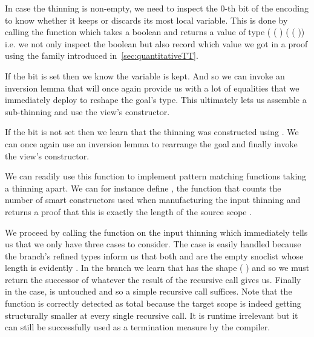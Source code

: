 
In case the thinning is non-empty, we need to inspect the 0-th bit of the encoding
to know whether it keeps or discards its most local variable.
%
This is done by calling the  function which takes a boolean
 and returns a value of type
{( ( ) ( ( ))}
i.e. we not only inspect the boolean but also record which value we got in a proof
using the  family introduced in~\cref{sec:quantitativeTT}.


If the bit is set then we know the variable is kept.
%
And so we can invoke an inversion lemma that will once again provide us with
a lot of equalities that we immediately deploy to reshape the goal's type.
%
This ultimately lets us assemble a sub-thinning and use the view's
 constructor.


If the bit is not set then we learn that the thinning was constructed using
. We can once again use an inversion lemma to rearrange
the goal and finally invoke the view's  constructor.






We can readily use this function to implement pattern matching functions taking
a thinning apart. We can for instance define , the function
that counts the number of  smart constructors used when
manufacturing the input thinning and returns a proof that this is exactly the
length of the source scope .


We proceed by calling the  function on the input thinning
which immediately tells us that we only have three cases to consider.
%
The  case is easily handled because the branch's refined
types inform us that both  and  are the
empty snoclist \IdrisData{[<]} whose length is evidently .
%
In the  branch we learn that  has the shape
(\IdrisBound{\KatlaUnderscore} \IdrisData{:<} ) and so we must return the
successor of whatever the result of the recursive call gives us.
%
Finally in the  case,  is untouched and so a
simple recursive call suffices.
%
Note that the function is correctly detected as total because the target scope
 is indeed getting structurally smaller at every single recursive
call.
%
It is runtime irrelevant but it can still be successfully used as a termination
measure by the compiler.

